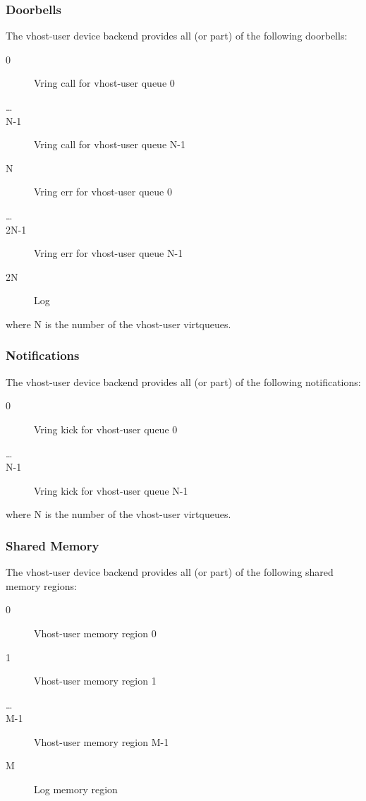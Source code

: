 \subsubsection{Doorbells}\label{sec:Device Types / Vhost-user Device Backend / Additional Device Resources / Doorbells}

The vhost-user device backend provides all (or part) of the following doorbells:

\begin{description}
\item[0] Vring call for vhost-user queue 0
\item[\ldots]
\item[N-1] Vring call for vhost-user queue N-1
\item[N] Vring err for vhost-user queue 0
\item[\ldots]
\item[2N-1] Vring err for vhost-user queue N-1
\item[2N] Log
\end{description}

where N is the number of the vhost-user virtqueues.

\subsubsection{Notifications}\label{sec:Device Types / Vhost-user Device Backend / Additional Device Resources / Notifications}

The vhost-user device backend provides all (or part) of the following
notifications:

\begin{description}
\item[0] Vring kick for vhost-user queue 0
\item[\ldots]
\item[N-1] Vring kick for vhost-user queue N-1
\end{description}

where N is the number of the vhost-user virtqueues.

\subsubsection{Shared Memory}\label{sec:Device Types / Vhost-user Device Backend / Additional Device Resources / Shared Memory}

The vhost-user device backend provides all (or part) of the following shared
memory regions:

\begin{description}
\item[0] Vhost-user memory region 0
\item[1] Vhost-user memory region 1
\item[\ldots]
\item[M-1] Vhost-user memory region M-1
\item[M] Log memory region
\end{description}

